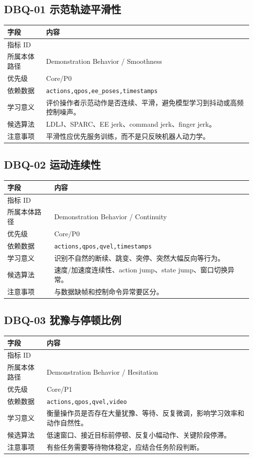 \documentclass[UTF8,zihao=-4]{ctexart}
\newcommand{\Code}[1]{\texttt{#1}}
\newcommand{\MID}[1]{\texttt{\seqsplit{#1}}}
\begin{document}
\subsection{DBQ-01 示范轨迹平滑性}

\begin{longtable}{L{3.6cm} L{9.6cm}}
\toprule
字段 & 内容 \\
\midrule
指标 ID & \MID{DBQ-01} \\
所属本体路径 & Demonstration Behavior / Smoothness \\
优先级 & Core/P0 \\
依赖数据 & \Code{actions,qpos,ee\_poses,timestamps} \\
学习意义 & 评价操作者示范动作是否连续、平滑，避免模型学习到抖动或高频控制噪声。 \\
候选算法 & LDLJ、SPARC、EE jerk、command jerk、finger jerk。 \\
注意事项 & 平滑性应优先服务训练，而不是只反映机器人动力学。 \\
\bottomrule
\end{longtable}

\subsection{DBQ-02 运动连续性}

\begin{longtable}{L{3.6cm} L{9.6cm}}
\toprule
字段 & 内容 \\
\midrule
指标 ID & \MID{DBQ-02} \\
所属本体路径 & Demonstration Behavior / Continuity \\
优先级 & Core/P0 \\
依赖数据 & \Code{actions,qpos,qvel,timestamps} \\
学习意义 & 识别不自然的断续、跳变、突停、突然大幅反向等行为。 \\
候选算法 & 速度/加速度连续性、action jump、state jump、窗口切换异常。 \\
注意事项 & 与数据缺帧和控制命令异常要区分。 \\
\bottomrule
\end{longtable}

\subsection{DBQ-03 犹豫与停顿比例}

\begin{longtable}{L{3.6cm} L{9.6cm}}
\toprule
字段 & 内容 \\
\midrule
指标 ID & \MID{DBQ-03} \\
所属本体路径 & Demonstration Behavior / Hesitation \\
优先级 & Core/P1 \\
依赖数据 & \Code{actions,qpos,qvel,video} \\
学习意义 & 衡量操作员是否存在大量犹豫、等待、反复微调，影响学习效率和动作自然性。 \\
候选算法 & 低速窗口、接近目标前停顿、反复小幅动作、关键阶段停滞。 \\
注意事项 & 有些任务需要等待物体稳定，应结合任务阶段判断。 \\
\bottomrule
\end{longtable}
\end{document}
